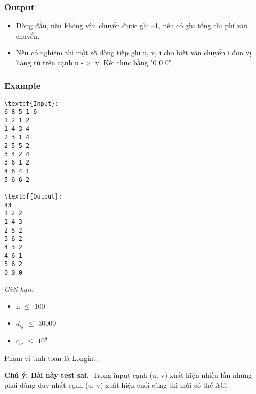 \subsubsection{Output}
\begin{itemize}
	\item Dòng đầu, nếu không vận chuyển được ghi –1, nếu có ghi tổng chi phí vận chuyển.
	\item Nếu có nghiệm thì một số dòng tiếp ghi u, v, i cho biết vận chuyển i đơn vị hàng từ trên cạnh u -$>$ v. Kết thúc bằng "0 0 0".
\end{itemize}

\subsubsection{Example}
\begin{verbatim}
\textbf{Input}:
6 8 5 1 6
1 2 1 2
1 4 3 4
2 3 1 4
2 5 5 2
3 4 2 4
3 6 1 2
4 6 4 1
5 6 6 2

\textbf{Output}:
43
1 2 2
1 4 3
2 5 2
3 6 2
4 3 2
4 6 1
5 6 2
0 0 0

\end{verbatim}

\emph{Giới hạn: }
\begin{itemize}
	\item n  $\le$  100
	\item $d_{ij}$  $\le$  30000
	\item $c_{ij}$  $\le$  $10^{9}$
\end{itemize}

Phạm vi tính toán là Longint.

\textbf{Chú ý: Bài này test sai. }Trong input cạnh (u, v) xuất hiện nhiều lần nhưng phải dùng duy nhất cạnh (u, v) xuất hiện cuối cùng thì mới có thể AC.
